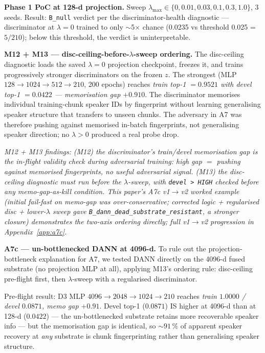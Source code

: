 \textbf{Phase 1 PoC at 128-d projection.} Sweep $\lambda_{\max} \in \{0, 0.01, 0.03, 0.1, 0.3, 1.0\}$, 3 seeds. Result: \texttt{B\_null} verdict per the discriminator-health diagnostic — discriminator at $\lambda{=}0$ trained to only $\sim$5$\times$ chance (0.0235 vs threshold 0.025 = $5/210$); below this threshold, the verdict is uninterpretable.

\textbf{M12 + M13 --- disc-ceiling-before-$\lambda$-sweep ordering.} The disc-ceiling diagnostic loads the saved $\lambda{=}0$ projection checkpoint, freezes it, and trains progressively stronger discriminators on the frozen $z$. The strongest (MLP $128 \to 1024 \to 512 \to 210$, 200 epochs) reaches \emph{train top-1 $= 0.9521$ with devel top-1 $= 0.0422$ --- memorisation gap $+0.910$}. The discriminator memorises individual training-chunk speaker IDs by fingerprint without learning generalising speaker structure that transfers to unseen chunks. The adversary in A7 was therefore pushing against memorised in-batch fingerprints, not generalising speaker direction; no $\lambda > 0$ produced a real probe drop.

\textit{M12 + M13 findings:} \emph{(M12) the discriminator's train/devel memorisation gap is the in-flight validity check during adversarial training: high gap $=$ pushing against memorised fingerprints, no useful adversarial signal. (M13) the disc-ceiling diagnostic must run before the $\lambda$-sweep, with \texttt{devel > HIGH} checked before any memo-gap-as-kill condition. This paper's A7c v1$\to$v2 worked example (initial fail-fast on memo-gap was over-conservative; corrected logic + regularised disc + lower-$\lambda$ sweep gave \texttt{B\_dann\_dead\_substrate\_resistant}, a stronger closure) demonstrates the two-axis ordering directly; full v1$\to$v2 progression in Appendix~\ref{app:a7c}.}

\textbf{A7c --- un-bottlenecked DANN at 4096-d.} To rule out the projection-bottleneck explanation for A7, we tested DANN directly on the 4096-d fused substrate (no projection MLP at all), applying M13's ordering rule: disc-ceiling pre-flight first, then $\lambda$-sweep with a regularised discriminator.

Pre-flight result: D3 MLP $4096 \to 2048 \to 1024 \to 210$ reaches \emph{train $1.0000$ / devel $0.0871$, memo gap $+0.91$}. Devel top-1 ($0.0871$) IS higher at 4096-d than at 128-d ($0.0422$) --- the un-bottlenecked substrate retains more recoverable speaker info --- but the memorisation gap is identical, so $\sim 91\,\%$ of apparent speaker recovery at \emph{any} substrate is chunk fingerprinting rather than generalising speaker structure.


